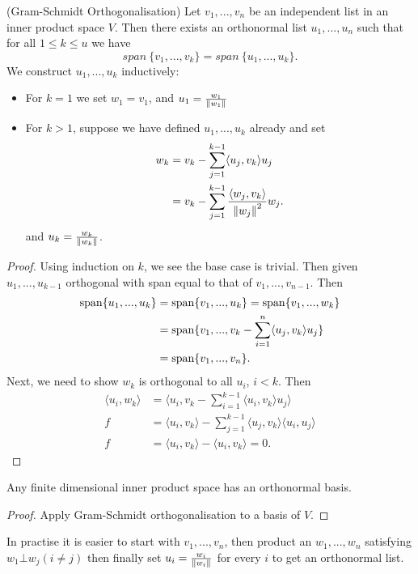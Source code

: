 \begin{theorem} (Gram-Schmidt Orthogonalisation)
  Let $v_1, ..., v_n$ be an independent list in an inner product space $V$. Then there exists an orthonormal list $u_1,...,u_n$ such that for all $1 \leq k \leq u$ we have
  \[span \ \{v_1,...,v_k\} = span \ \{u_1,...,u_k\}.\]
  We construct $u_1,...,u_k$ inductively:
  \begin{itemize}
    \item For $k = 1$ we set $w_1 = v_1$, and $u_1 = \frac{w_1}{\left\lVert w_1 \right\rVert}$
    \item For $k > 1$, suppose we have defined $u_1,...,u_k$ already and set 
  \begin{align*}
    w_k &= v_k - \sum_{ j = 1}^{k - 1} \langle u_j, v_k \rangle u_j \\
    &= v_k - \sum_{ j = 1}^{k-1} \frac{\langle w_j, v_k \rangle}{\left\lVert w_j \right\rVert^2} w_j
  .\end{align*}
  and $u_k = \frac{w_k}{\left\lVert w_k \right\rVert}$.

  \end{itemize}
\end{theorem}
\begin{proof}
  Using induction on $k$, we see the base case is trivial. Then given $u_1,...,u_{k-1}$ orthogonal with span equal to that of $v_1,...,v_{n-1}$. Then
  \begin{align*}
    \operatorname{span}\{ u_1,...,u_k\} &= \operatorname{span} \{v_1,...,u_k\} = \operatorname{span} \{v_1,..., w_k\} \\
     &= \operatorname{span} \{v_1,..., v_k - \sum_{ i = 1}^{n} \langle u_j, v_k \rangle u_j\} \\
     &= \operatorname{span} \{v_1,...,v_n\}
  .\end{align*}
  Next, we need to show $w_k$ is orthogonal to all $u_i$, $i < k$. Then
  \begin{align*}
    \langle u_i, w_k \rangle &= \langle u_i, v_k - \sum_{ i = 1}^{k-1} \langle u_i, v_k \rangle u_j \rangle \\
    f &= \langle u_i, v_k \rangle - \sum_{ j = 1}^{k-1} \langle u_j, v_k \rangle \langle u_i, u_j \rangle \\
    f &= \langle u_i, v_k \rangle - \langle u_i, v_k \rangle = 0
  .\end{align*}
\end{proof}

\begin{corollary}
    Any finite dimensional inner product space has an orthonormal basis.
\end{corollary}
\begin{proof}
  Apply Gram-Schmidt orthogonalisation to a basis of $V$.
\end{proof}

\begin{remark}
    In practise it is easier to start with $v_1,...,v_n$, then product an $w_1,...,w_n$ satisfying $w_1 \bot w_j (i \not = j)$ then finally set $u_i = \frac{w_i}{ \left\lVert w_i \right\rVert}$ for every $i$ to get an orthonormal list.
\end{remark}
